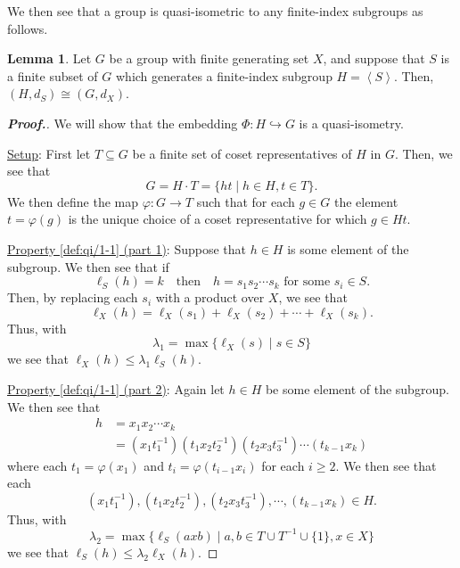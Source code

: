 \documentclass[11pt,a4paper,reqno]{amsart}
\theoremstyle{plain}
\theoremstyle{definition}
\newtheorem{lemma}[theorem]{Lemma}
\theoremstyle{definition}
\renewcommand\leq\leqslant
\renewcommand\geq\geqslant
\newenvironment{myproof}{\begin{proof}[\normalfont\bfseries Proof.]}{\end{proof}}
\begin{document}
We then see that a group is quasi-isometric to any finite-index subgroups as follows.

\begin{lemma}
	Let $G$ be a group with finite generating set $X$, and suppose that $S$ is a finite subset of $G$ which generates a finite-index subgroup $H = \left\langle S \right\rangle$.
	Then, $(H,d_S)\cong(G,d_X)$.
\end{lemma}

\begin{myproof}
We will show that the embedding $\Phi\colon H \hookrightarrow G$ is a quasi-isometry.

\medskip
\noindent
\underline{Setup}:
First let $T \subseteq G$ be a finite set of coset representatives of $H$ in $G$.
Then, we see that
\[
	G = H\cdot T = \{
		h t
	\mid
		h\in H, t\in T
	\}.
\]
We then define the map $\varphi\colon G\to T$ such that for each $g\in G$ the element $t= \varphi(g)$ is the unique choice of a coset representative for which $g \in H t$.

\medskip
\noindent
\underline{Property \ref{def:qi/1-1} (part 1)}:
Suppose that $h\in H$ is some element of the subgroup.
We then see that if
\[
	\ell_S(h) = k
	\quad
	\text{then}
	\quad
	h = s_1 s_2 \cdots s_k
	\text{ for some }s_i \in S.
\]
Then, by replacing each $s_i$ with a product over $X$, we see that
\[
	\ell_X(h) = \ell_X(s_1) + \ell_X(s_2) + \cdots + \ell_X(s_k).
\]
Thus, with 
\begin{equation}\label{eq:lam1}
	\lambda_1 = \max\{\ell_X(s) \mid s\in S\}
\end{equation}
we see that $\ell_X(h) \leq \lambda_1 \ell_S(h)$.

\medskip
\noindent
\underline{Property \ref{def:qi/1-1} (part 2)}:
Again let $h\in H$ be some element of the subgroup.
We then see that
\begin{align*}
	h
	&=
	x_1
	x_2
	\cdots
	x_k
	\\
	&=
	(x_1 t_1^{-1})
	(t_1 x_2 t_2^{-1})
	(t_2 x_3 t_3^{-1})
	\cdots
	(t_{k-1} x_k)
\end{align*}
where each $t_1 = \varphi(x_1)$ and $t_i = \varphi(t_{i-1} x_i)$ for each $i \geq 2$.
We then see that each
\[
	(x_1 t_1^{-1}),
	(t_1 x_2 t_2^{-1}),
	(t_2 x_3 t_3^{-1}),
	\cdots,
	(t_{k-1} x_k)
	\in H.
\]
Thus, with
\begin{equation}\label{eq:lam2}
	\lambda_2
	=
	\max\{
		\ell_S(a x b)
	\mid
		a,b\in T\cup T^{-1}\cup \{1\},
		x\in X
	\}
\end{equation}
we see that $\ell_S(h) \leq \lambda_2 \ell_X(h)$.


\end{myproof}
\end{document}
